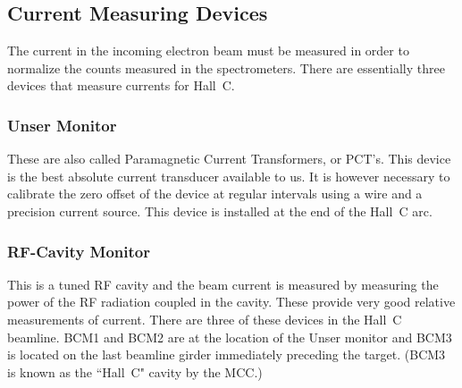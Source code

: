 {%

\subsection{Current Measuring Devices}

The current in the incoming electron beam must be measured in order to
normalize the counts measured in the spectrometers. There are essentially
three devices that measure currents for Hall~C.

\subsubsection{Unser Monitor}  These are also called Paramagnetic Current Transformers,
or PCT's. This device is the best absolute current transducer available to us.
It is however necessary to calibrate the zero offset of the device at
regular intervals using a wire and a precision current source. This device
is installed at the end of the Hall~C arc.
\subsubsection{RF-Cavity Monitor} This is a tuned RF cavity and the beam current
is measured by measuring the power of the RF radiation coupled in the cavity.
These provide very good relative measurements of current. There are three
of these
devices in the Hall~C beamline. BCM1 and BCM2 are at the location of the Unser
monitor and BCM3 is located on the last beamline girder
immediately preceding the target.  (BCM3 is known as the ``Hall~C" cavity 
by the MCC.)


}%
